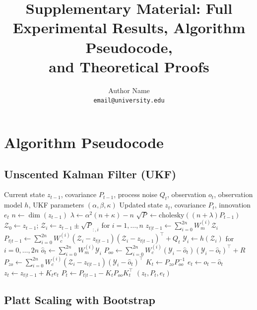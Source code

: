 \documentclass[12pt,a4paper]{article}
\title{Supplementary Material: Full Experimental Results, Algorithm Pseudocode,\\ and Theoretical Proofs}
\author{Author Name \\ \texttt{email@university.edu}}
\begin{document}
\maketitle

\section{Algorithm Pseudocode}

\subsection{Unscented Kalman Filter (UKF)}

\begin{algorithm}[h]
\caption{UKF Predict and Update}
\label{alg:ukf}
\begin{algorithmic}[1]
\Require Current state $z_{t-1}$, covariance $P_{t-1}$, process noise $Q_t$, observation $o_t$, observation model $h$, UKF parameters $(\alpha, \beta, \kappa)$
\Ensure Updated state $z_t$, covariance $P_t$, innovation $e_t$
\State $n \gets \dim(z_{t-1})$
\State $\lambda \gets \alpha^2 (n + \kappa) - n$
\State $\sqrt{P} \gets \text{cholesky}((n + \lambda) P_{t-1})$
\State $\mathcal{Z}_0 \gets z_{t-1}$; $\mathcal{Z}_i \gets z_{t-1} \pm \sqrt{P}_{:,i}$ for $i=1,\ldots,n$
\State $z_{t|t-1} \gets \sum_{i=0}^{2n} W_m^{(i)} \mathcal{Z}_i$
\State $P_{t|t-1} \gets \sum_{i=0}^{2n} W_c^{(i)} (\mathcal{Z}_i - z_{t|t-1})(\mathcal{Z}_i - z_{t|t-1})^\top + Q_t$
\State $\mathcal{Y}_i \gets h(\mathcal{Z}_i)$ for $i=0,\ldots,2n$
\State $\hat{o}_t \gets \sum_{i=0}^{2n} W_m^{(i)} \mathcal{Y}_i$
\State $P_{oo} \gets \sum_{i=0}^{2n} W_c^{(i)} (\mathcal{Y}_i - \hat{o}_t)(\mathcal{Y}_i - \hat{o}_t)^\top + R$
\State $P_{zo} \gets \sum_{i=0}^{2n} W_c^{(i)} (\mathcal{Z}_i - z_{t|t-1})(\mathcal{Y}_i - \hat{o}_t)^\top$
\State $K_t \gets P_{zo} P_{oo}^{-1}$
\State $e_t \gets o_t - \hat{o}_t$
\State $z_t \gets z_{t|t-1} + K_t e_t$
\State $P_t \gets P_{t|t-1} - K_t P_{oo} K_t^\top$
\State \Return $(z_t, P_t, e_t)$
\end{algorithmic}
\end{algorithm}

\subsection{Platt Scaling with Bootstrap}
\end{document}
